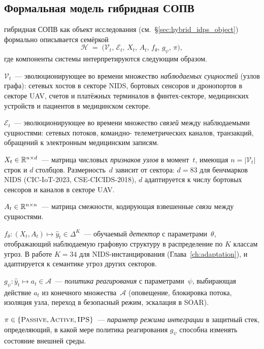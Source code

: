 \subsection{Формальная модель гибридная СОПВ}
\label{subsec:idps_formal_model}

гибридная СОПВ как объект исследования (см.~\S\ref{sec:hybrid_idps_object})
формально описывается семёркой
\begin{equation}
\mathcal{H} \;=\; \bigl(\mathcal{V}_t,\,\mathcal{E}_t,\,X_t,\,A_t,\,
f_\theta,\,g_\psi,\,\pi\bigr),
\label{eq:hybrid_idps_tuple}
\end{equation}
где компоненты системы интерпретируются следующим образом.

\noindent\textbf{$\mathcal{V}_t$}~--- эволюционирующее во времени множество
\emph{наблюдаемых сущностей} (узлов графа): сетевых хостов в секторе
NIDS, бортовых сенсоров и дронопортов в секторе UAV, счетов и платёжных
терминалов в финтех-секторе, медицинских устройств и пациентов в
медицинском секторе.

\noindent\textbf{$\mathcal{E}_t$}~--- эволюционирующее во времени множество
\emph{связей} между наблюдаемыми сущностями: сетевых потоков, командно-
телеметрических каналов, транзакций, обращений к электронным
медицинским записям.

\noindent\textbf{$X_t \in \mathbb{R}^{n\times d}$}~--- матрица числовых
\emph{признаков узлов} в момент~$t$, имеющая $n=|\mathcal{V}_t|$ строк
и $d$ столбцов. Размерность~$d$ зависит от сектора: $d=83$ для
бенчмарков NIDS (CIC-IoT-2023, CSE-CICIDS-2018), $d$ адаптируется к
числу бортовых сенсоров и каналов в секторе UAV.

\noindent\textbf{$A_t \in \mathbb{R}^{n\times n}$}~--- матрица смежности,
кодирующая взвешенные \emph{связи} между сущностями.

\noindent\textbf{$f_\theta: (X_t, A_t) \mapsto \hat{y}_t \in \Delta^K$}~---
обучаемый \emph{детектор} с параметрами~$\theta$, отображающий
наблюдаемую графовую структуру в распределение по $K$ классам
угроз. В работе $K=34$ для NIDS-инстанцирования (Глава~\ref{ch:adaptation}),
и адаптируется к семантике угроз других секторов.

\noindent\textbf{$g_\psi: \hat{y}_t \mapsto a_t \in \mathcal{A}$}~---
\emph{политика реагирования} с параметрами~$\psi$, выбирающая действие
$a_t$ из конечного множества~$\mathcal{A}$ (оповещение, блокировка
потока, изоляция узла, переход в безопасный режим, эскалация в SOAR).

\noindent\textbf{$\pi \in \{\textsc{Passive}, \textsc{Active},
\textsc{IPS}\}$}~--- \emph{параметр режима интеграции} в защитный стек,
определяющий, в какой мере политика реагирования $g_\psi$ способна
изменять состояние внешней среды.

